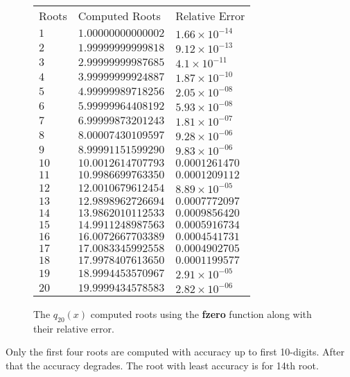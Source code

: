 \begin{figure}[tbh]
 \centering  
  
\begin{tabular}{ |p{1cm}|| p{4cm}|p{4cm}|| }
 \hline
 Roots & Computed Roots &  Relative Error \\ \hhline{|=|=|=|}
 
 $1$         & $1.00000000000002$ &$1.66\times 10^{-14}$ \\ 
 \hline
 $2$         & $1.99999999999818$ &$9.12\times 10^{-13}$ \\ 
 \hline
 $3$         & $2.99999999987685$ &$4.1\times 10^{-11}$  \\ 
 \hline
 $4$         & $3.99999999924887$ &$1.87\times 10^{-10}$ \\ 
 \hline
 $5$         & $4.99999989718256$ &$2.05\times 10^{-08}$ \\ 
 \hline
 $6$         & $5.99999964408192$ &$5.93\times 10^{-08}$ \\ 
 \hline
 $7$         & $6.99999873201243$ &$1.81\times 10^{-07}$ \\ 
 \hline
 $8$         & $8.00007430109597$ &$9.28\times 10^{-06}$ \\ 
 \hline
 $9$         & $8.99991151599290$ &$9.83\times 10^{-06}$ \\ 
 \hline
 $10$        & $10.0012614707793$ &$0.0001261470$ \\ 
 \hline
 $11$        & $10.9986699763350$ &$0.0001209112$ \\ 
 \hline
 $12$        & $12.0010679612454$ &$8.89\times 10^{-05}$ \\ 
 \hline
 $13$        & $12.9898962726694$ &$0.0007772097$ \\ 
 \hline
 $14$        & $13.9862010112533$ &$0.0009856420$ \\ 
 \hline
 $15$        & $14.9911248987563$ &$0.0005916734$ \\ 
 \hline
 $16$        & $16.0072667703389$ &$0.0004541731$ \\ 
 \hline
 $17$        & $17.0083345992558$ &$0.0004902705$ \\ 
 \hline
 $18$        & $17.9978407613650$ &$0.0001199577$ \\ 
 \hline
 $19$        & $18.9994453570967$ &$2.91\times 10^{-05}$ \\ 
 \hline
 $20$        & $19.9999434578583$ &$2.82\times 10^{-06}$ \\ 
 \hline 
\end{tabular}
  \caption{The $q_{20}(x)$ computed roots using the \textbf{fzero} function along with their relative error.}   
\end{figure} 
Only the first four roots are computed with accuracy up to first 10-digits. After that the accuracy degrades. The root with least accuracy is for 14th root.  

